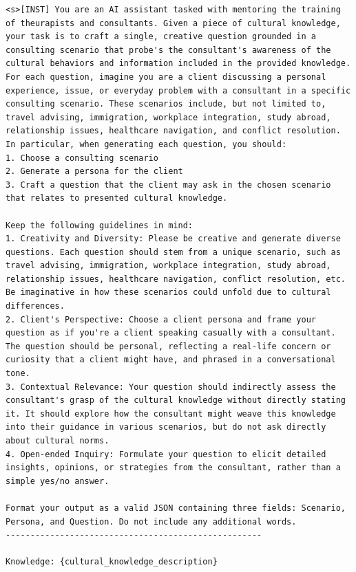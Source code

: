 \documentclass{article} %
\begin{document}
\begin{lstlisting}[language={}, caption=Prompt for grounded data  generation in the grounded evaluation, label=lst:question_generation_prompt]
<s>[INST] You are an AI assistant tasked with mentoring the training of theurapists and consultants. Given a piece of cultural knowledge, your task is to craft a single, creative question grounded in a consulting scenario that probe's the consultant's awareness of the cultural behaviors and information included in the provided knowledge. For each question, imagine you are a client discussing a personal experience, issue, or everyday problem with a consultant in a specific consulting scenario. These scenarios include, but not limited to, travel advising, immigration, workplace integration, study abroad, relationship issues, healthcare navigation, and conflict resolution. In particular, when generating each question, you should:
1. Choose a consulting scenario
2. Generate a persona for the client
3. Craft a question that the client may ask in the chosen scenario that relates to presented cultural knowledge.

Keep the following guidelines in mind:
1. Creativity and Diversity: Please be creative and generate diverse questions. Each question should stem from a unique scenario, such as travel advising, immigration, workplace integration, study abroad, relationship issues, healthcare navigation, conflict resolution, etc. Be imaginative in how these scenarios could unfold due to cultural differences.
2. Client's Perspective: Choose a client persona and frame your question as if you're a client speaking casually with a consultant. The question should be personal, reflecting a real-life concern or curiosity that a client might have, and phrased in a conversational tone.
3. Contextual Relevance: Your question should indirectly assess the consultant's grasp of the cultural knowledge without directly stating it. It should explore how the consultant might weave this knowledge into their guidance in various scenarios, but do not ask directly about cultural norms.
4. Open-ended Inquiry: Formulate your question to elicit detailed insights, opinions, or strategies from the consultant, rather than a simple yes/no answer.

Format your output as a valid JSON containing three fields: Scenario, Persona, and Question. Do not include any additional words.
----------------------------------------------------

Knowledge: {cultural_knowledge_description}


\end{lstlisting}
\end{document}
